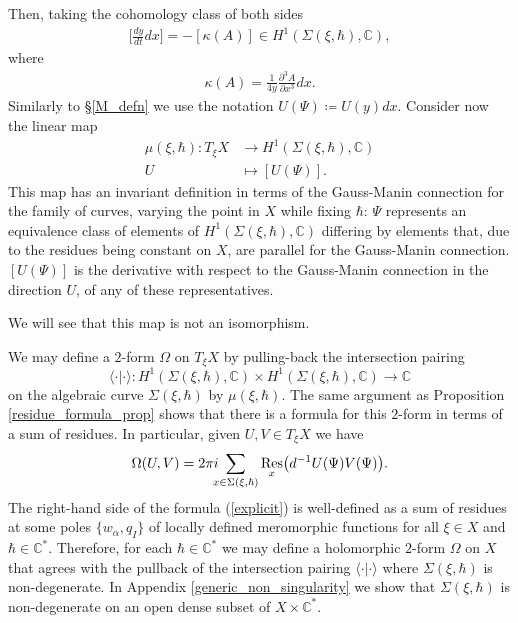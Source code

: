 \documentclass[a4paper,12pt,reqno]{amsart}
\numberwithin{equation}{section}
\numberwithin{counter2}{section}
\begin{document}
Then,  taking the cohomology class of both sides
\begin{align}\label{cohomology_condition}
\Bigg[\frac{dy}{dt}dx\Bigg] = -[\kappa(A)] \in H^1(\Sigma(\xi,\hbar),\mathbb{C}),  
\end{align}
where 
\begin{align}
\kappa(A) = \frac{1}{4y}\frac{\partial^3 A}{\partial x^3} dx.
\end{align}
Similarly to \S\ref{M_defn} we use the notation $U(\Psi) \coloneqq U(y)dx$.  Consider now the linear map
\begin{align}
 \mu(\xi,\hbar) : T_{\xi}X &\to H^1(\Sigma(\xi,\hbar),\mathbb{C}) \\
 U &\mapsto [U(\Psi)] \nonumber.
 \end{align}
This map has an invariant definition in terms of the Gauss-Manin connection for the family of curves,  varying the point in $X$ while fixing $\hbar$: $\Psi$ represents an equivalence class of elements of $H^1(\Sigma(\xi,\hbar),\mathbb{C})$ differing by elements that,  due to the residues being constant on $X$,  are parallel for the Gauss-Manin connection.  $[U(\Psi)]$ is the derivative with respect to the Gauss-Manin connection in the direction $U$,  of any of these representatives.  \par
We will see that this map is not an isomorphism.  \par We may define a  $2$-form $\Omega$ on $T_{\xi}X$ by pulling-back the intersection pairing
$$
 \langle \cdot | \cdot \rangle: H^1(\Sigma(\xi,\hbar),\mathbb{C}) \times H^1(\Sigma(\xi,\hbar),\mathbb{C}) \to \mathbb{C}
$$
on the algebraic curve $\Sigma(\xi,\hbar)$ by $\mu(\xi,\hbar)$.  The same argument as Proposition \ref{residue_formula_prop} shows that there is a formula for this $2$-form in terms of a sum of residues.  In particular,  given $U,V \in T_{\xi}X$ we have 
\begin{align}\label{explicit}
\Omega(U,V) = 2\pi i  \hspace{-2mm}  \sum_{x \in \Sigma({\xi,\hbar})}    \underset{x}{\operatorname{Res}}\big(d^{-1} U(\Psi)V(\Psi)\big).
\end{align}
The right-hand side of the formula (\ref{explicit}) is well-defined as a sum of residues at some poles $\{w_\alpha, q_I\}$ of locally defined meromorphic functions for all $\xi \in X$ and $\hbar \in \mathbb{C}^*$.  Therefore,  for each $\hbar \in \mathbb{C}^*$ we may define a holomorphic $2$-form $\Omega$ on $X$ that agrees with the pullback of the intersection pairing $\langle \cdot | \cdot \rangle$ where $\Sigma(\xi,\hbar)$ is non-degenerate.  
In Appendix \ref{generic_non_singularity} we show that $\Sigma(\xi,\hbar)$ is non-degenerate on an open dense subset of $X \times \mathbb{C}^*$.  
\end{document}
